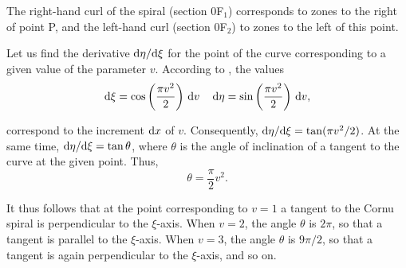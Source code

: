 \noindent
The right-hand curl of the spiral (section $0$F$_1$) corresponds to zones to the right of point P, and the left-hand curl (section $0$F$_2$) to zones to the left of this point.

Let us find the derivative $\mathrm{d}\eta/\mathrm{d}\xi$ for the point of the curve corresponding to a given value of the parameter $v$.
According to , the values
\begin{equation*}
	\mathrm{d}\xi = \cos\left(\frac{\pi v^2}{2}\right)\, \mathrm{d} v\, \quad \mathrm{d}\eta = \sin\left(\frac{\pi v^2}{2}\right)\, \mathrm{d} v,
\end{equation*}

\noindent
correspond to the increment $\mathrm{d} x$ of $v$.
Consequently, $\mathrm{d}\eta/\mathrm{d}\xi=\tan(\pi v^2/2)$.
At the same time, $\mathrm{d}\eta/\mathrm{d}\xi= \tan\theta$, where $\theta$ is the angle of inclination of a tangent to the curve at the given point.
Thus,
\begin{equation}\label{eq:18_20}
	\theta = \frac{\pi}{2} v^2.
\end{equation}

\noindent
It thus follows that at the point corresponding to $v=1$ a tangent to the Cornu spiral is perpendicular to the $\xi$-axis.
When $v=2$, the angle $\theta$ is $2\pi$, so that a tangent is parallel to the $\xi$-axis.
When $v=3$, the angle $\theta$ is $9\pi/2$, so that a tangent is again perpendicular to the $\xi$-axis, and so on.

